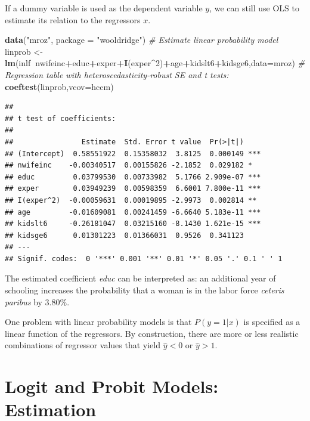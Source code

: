 \documentclass[]{book}
\newenvironment{Shaded}{\begin{snugshade}}{\end{snugshade}}
\newcommand{\CommentTok}[1]{\textcolor[rgb]{0.56,0.35,0.01}{\textit{#1}}}
\newcommand{\DataTypeTok}[1]{\textcolor[rgb]{0.13,0.29,0.53}{#1}}
\newcommand{\DecValTok}[1]{\textcolor[rgb]{0.00,0.00,0.81}{#1}}
\newcommand{\KeywordTok}[1]{\textcolor[rgb]{0.13,0.29,0.53}{\textbf{#1}}}
\newcommand{\NormalTok}[1]{#1}
\newcommand{\OperatorTok}[1]{\textcolor[rgb]{0.81,0.36,0.00}{\textbf{#1}}}
\newcommand{\StringTok}[1]{\textcolor[rgb]{0.31,0.60,0.02}{#1}}
\begin{document}
If a dummy variable is used as the dependent variable \(y\), we can
still use OLS to estimate its relation to the regressors \(x\).

\begin{Shaded}
\begin{Highlighting}[]
\KeywordTok{data}\NormalTok{(}\StringTok{"mroz"}\NormalTok{, }\DataTypeTok{package =} \StringTok{"wooldridge"}\NormalTok{)}
\CommentTok{# Estimate linear probability model}
\NormalTok{linprob <-}\StringTok{ }\KeywordTok{lm}\NormalTok{(inlf}\OperatorTok{~}\NormalTok{nwifeinc}\OperatorTok{+}\NormalTok{educ}\OperatorTok{+}\NormalTok{exper}\OperatorTok{+}\KeywordTok{I}\NormalTok{(exper}\OperatorTok{^}\DecValTok{2}\NormalTok{)}\OperatorTok{+}\NormalTok{age}\OperatorTok{+}\NormalTok{kidslt6}\OperatorTok{+}\NormalTok{kidsge6,}\DataTypeTok{data=}\NormalTok{mroz)}
\CommentTok{# Regression table with heteroscedasticity-robust SE and t tests:}
\KeywordTok{coeftest}\NormalTok{(linprob,}\DataTypeTok{vcov=}\NormalTok{hccm)}
\end{Highlighting}
\end{Shaded}

\begin{verbatim}
## 
## t test of coefficients:
## 
##                Estimate  Std. Error t value  Pr(>|t|)    
## (Intercept)  0.58551922  0.15358032  3.8125  0.000149 ***
## nwifeinc    -0.00340517  0.00155826 -2.1852  0.029182 *  
## educ         0.03799530  0.00733982  5.1766 2.909e-07 ***
## exper        0.03949239  0.00598359  6.6001 7.800e-11 ***
## I(exper^2)  -0.00059631  0.00019895 -2.9973  0.002814 ** 
## age         -0.01609081  0.00241459 -6.6640 5.183e-11 ***
## kidslt6     -0.26181047  0.03215160 -8.1430 1.621e-15 ***
## kidsge6      0.01301223  0.01366031  0.9526  0.341123    
## ---
## Signif. codes:  0 '***' 0.001 '**' 0.01 '*' 0.05 '.' 0.1 ' ' 1
\end{verbatim}

The estimated coefficient \emph{educ} can be interpreted as: an
additional year of schooling increases the probability that a woman is
in the labor force \emph{ceteris paribus} by 3.80\%.

One problem with linear probability models is that \(P(y=1|x)\) is
specified as a linear function of the regressors. By construction, there
are more or less realistic combinations of regressor values that yield
\(\hat{y} < 0\) or \(\hat{y} > 1\).

\hypertarget{logit-and-probit-models-estimation}{%
\section{Logit and Probit Models:
Estimation}\label{logit-and-probit-models-estimation}}
\end{document}
